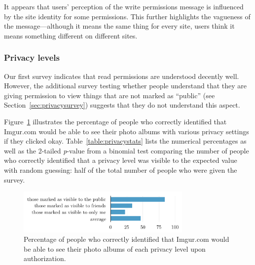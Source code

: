 \documentclass[10pt]{sig-alternate-10pt}
\begin{document}
It appears that users' perception of the write permissions message is influenced by the site identity for some permissions. This further highlights the vagueness of the message---although it means the same thing for every site, users think it means something different on different sites.

\subsubsection{Privacy levels}

Our first survey indicates that read permissions are understood decently well. However, the additional survey testing whether people understand that they are giving permission to view things that are not marked as ``public'' (see Section~\ref{sec:privacysurvey}) suggests that they do not understand this aspect.

Figure~\ref{figure:privacypercents} illustrates the percentage of people who correctly identified that Imgur.com would be able to see their photo albums with various privacy settings if they clicked okay. Table~\ref{table:privacystats} lists the numerical percentages as well as the 2-tailed \emph{p}-value from a binomial test comparing the number of people who correctly identified that a privacy level was visible to the expected value with random guessing: half of the total number of people who were given the survey.

\begin{figure}[h!]
  \centering
  \includegraphics[width=8.5cm]{privacy_percents_cosn}
  \caption{Percentage of people who correctly identified that Imgur.com would be able to see their photo albums of each privacy level upon authorization.}
  \label{figure:privacypercents}
\end{figure}
\end{document}
